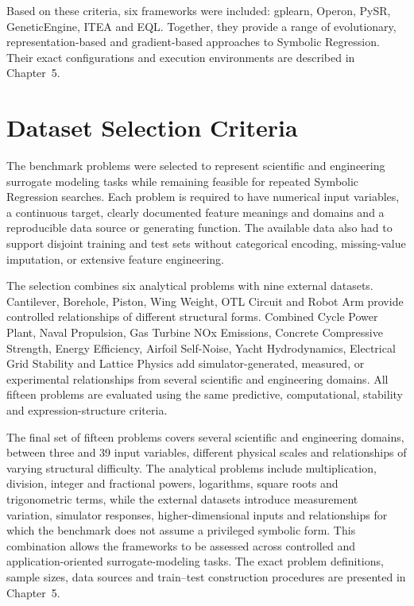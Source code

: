 \documentclass[12pt,oneside,bibtotoc,liststotoc]{scrbook}
\begin{document}
Based on these criteria, six frameworks were included: gplearn, Operon, PySR, GeneticEngine, ITEA and EQL. Together, they provide a range of evolutionary, representation-based and gradient-based approaches to Symbolic Regression. Their exact configurations and execution environments are described in Chapter~5.

\section{Dataset Selection Criteria}

The benchmark problems were selected to represent scientific and engineering surrogate modeling tasks while remaining feasible for repeated Symbolic Regression searches. Each problem is required to have numerical input variables, a continuous target, clearly documented feature meanings and domains and a reproducible data source or generating function. The available data also had to support disjoint training and test sets without categorical encoding, missing-value imputation, or extensive feature engineering.

The selection combines six analytical problems with nine external datasets. Cantilever, Borehole, Piston, Wing Weight, OTL Circuit and Robot Arm provide controlled relationships of different structural forms. Combined Cycle Power Plant, Naval Propulsion, Gas Turbine NOx Emissions, Concrete Compressive Strength, Energy Efficiency, Airfoil Self-Noise, Yacht Hydrodynamics, Electrical Grid Stability and Lattice Physics add simulator-generated, measured, or experimental relationships from several scientific and engineering domains. All fifteen problems are evaluated using the same predictive, computational, stability and expression-structure criteria.

The final set of fifteen problems covers several scientific and engineering domains, between three and 39 input variables, different physical scales and relationships of varying structural difficulty. The analytical problems include multiplication, division, integer and fractional powers, logarithms, square roots and trigonometric terms, while the external datasets introduce measurement variation, simulator responses, higher-dimensional inputs and relationships for which the benchmark does not assume a privileged symbolic form. This combination allows the frameworks to be assessed across controlled and application-oriented surrogate-modeling tasks. The exact problem definitions, sample sizes, data sources and train--test construction procedures are presented in Chapter~5.
\end{document}
